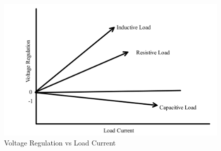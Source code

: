 \documentclass[a4paper,12pt]{article}
\begin{document}
	\begin{figure}[H]
	\centering
	\includegraphics[width=0.71\linewidth]{Images/p}
	\caption{Voltage Regulation  vs Load Current }
	\label{fig:st}
\end{figure}







	\newpage
\end{document}
